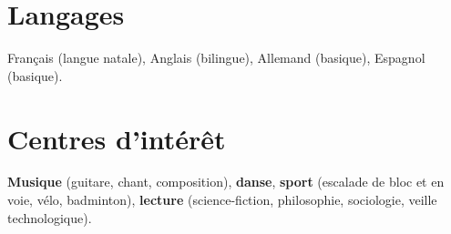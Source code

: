 \documentclass[11pt,a4paper,sans,colorlinks,linkcolor=blue]{moderncv} %
\renewcommand*{\cvitem}[3][.25em]{%
\ifthenelse{\equal{#2}{}}{}{\hintstyle{#2} }{#3}%
\par\addvspace{#1}}
\begin{document}


\section{Langages}
Français (langue natale), Anglais (bilingue), Allemand (basique), Espagnol (basique).


\section{Centres d'intérêt}
\textbf{Musique} (guitare, chant, composition),
\textbf{danse},
\textbf{sport} (escalade de bloc et en voie, vélo, badminton),
\textbf{lecture} (science-fiction, philosophie, sociologie, veille technologique).

\end{document}
